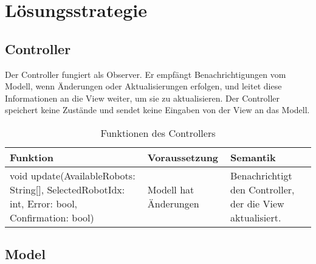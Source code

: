 \chapter{Lösungsstrategie}

\section{Controller}
Der Controller fungiert als Observer. 
Er empfängt Benachrichtigungen vom Modell, wenn Änderungen oder Aktualisierungen erfolgen, und leitet diese Informationen an die View weiter, um sie zu aktualisieren. 
Der Controller speichert keine Zustände und sendet keine Eingaben von der View an das Modell.

\begin{table}[h!]
    \centering
    \begin{tabular}{|p{5cm}|p{5cm}|p{5cm}|}
        \hline
        \textbf{Funktion} & \textbf{Voraussetzung} & \textbf{Semantik} \\
        \hline
        void update(AvailableRobots: String[], SelectedRobotIdx: int, Error: bool, Confirmation: bool) & Modell hat Änderungen & Benachrichtigt den Controller, der die View aktualisiert. \\
        \hline
    \end{tabular}
    \caption{Funktionen des Controllers}
    \label{tab:Controller}
\end{table}


\section{Model}

